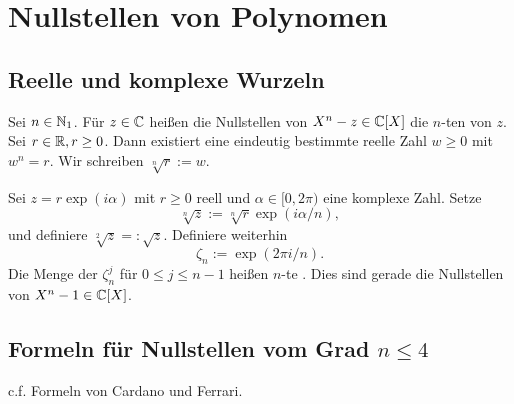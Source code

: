 \chapter{Nullstellen von Polynomen}
\section{Reelle und komplexe Wurzeln}
Sei $n\in \mathbb{N}_1$. Für $z\in \mathbb{C}$ heißen die Nullstellen von $X^n-z\in \mathbb{C}[X]$ die $n$-ten  von $z$.
Sei $r\in \mathbb{R},r\geq 0$. Dann existiert eine eindeutig bestimmte reelle Zahl $w\geq 0$ mit $w^n=r$. Wir schreiben $\sqrt[n]{r}:=w$.\par
Sei $z=r\exp(i\alpha)$ mit $r\geq 0$ reell und $\alpha \in [0,2\pi)$ eine komplexe Zahl. Setze
\[
\sqrt[n]{z}:= \sqrt[n]{r}\exp(i\alpha/n),
\]
und definiere $\sqrt[2]{z}=:\sqrt{z}$. Definiere weiterhin
\[
\zeta_n:= \exp(2\pi i/n).
\]
Die Menge der $\zeta_n^j$ für $0\leq j\leq n-1$ heißen $n$-te . Dies sind gerade die Nullstellen von $X^n-1\in \mathbb{C}[X]$.

\section{Formeln für Nullstellen vom Grad $n\leq 4$}
c.f. Formeln von Cardano und Ferrari.

